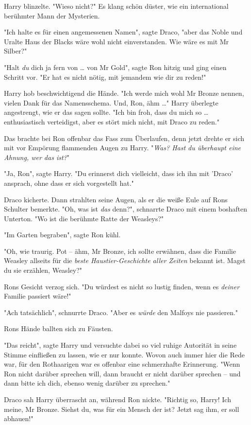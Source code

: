 {Harry blinzelte. "Wieso nicht?" Es klang schön düster, wie ein international berühmter Mann der Mysterien.

"Ich halte es für einen angemessenen Namen", sagte Draco, "aber das Noble und Uralte Haus der Blacks wäre wohl nicht einverstanden. Wie wäre es mit Mr Silber?"

"Halt \emph{du} dich ja fern von … von Mr Gold", sagte Ron hitzig und ging einen Schritt vor. "Er hat es nicht nötig, mit jemandem wie dir zu reden!"

Harry hob beschwichtigend die Hände. "Ich werde mich wohl Mr Bronze nennen, vielen Dank für das Namensschema. Und, Ron, ähm …" Harry überlegte angestrengt, wie er das sagen sollte. "Ich bin froh, dass du mich so … enthusiastisch verteidigst, aber es stört mich nicht, mit Draco zu reden."

Das brachte bei Ron offenbar das Fass zum Überlaufen, denn jetzt drehte er sich mit vor Empörung flammenden Augen zu Harry. "\emph{Was? Hast du überhaupt eine Ahnung, wer das ist?}"

"Ja, Ron", sagte Harry. "Du erinnerst dich vielleicht, dass ich ihn mit 'Draco' ansprach, ohne dass er sich vorgestellt hat."

Draco kicherte. Dann strahlten seine Augen, als er die weiße Eule auf Rons Schulter bemerkte. "Oh, was ist \emph{das} denn?", schnarrte Draco mit einem boshaften Unterton. "Wo ist die berühmte Ratte der Weasleys?"

"Im Garten begraben", sagte Ron kühl.

"Oh, wie traurig. Pot -- ähm, Mr Bronze, ich sollte erwähnen, dass die Familie Weasley allseits für die \emph{beste Haustier-Geschichte aller Zeiten} bekannt ist. Magst du sie erzählen, Weasley?"

Rons Gesicht verzog sich. "Du würdest es nicht so lustig finden, wenn es \emph{deiner} Familie passiert wäre!"

"Ach tatsächlich", schnurrte Draco. "Aber es \emph{würde} den Malfoys nie passieren."

Rons Hände ballten sich zu Fäusten.

"Das reicht", sagte Harry und versuchte dabei so viel ruhige Autorität in seine Stimme einfließen zu lassen, wie er nur konnte. Wovon auch immer hier die Rede war, für den Rothaarigen war es offenbar eine schmerzhafte Erinnerung. "Wenn Ron nicht darüber sprechen will, dann braucht er nicht darüber sprechen -- und dann bitte ich dich, ebenso wenig darüber zu sprechen."

Draco sah Harry überrascht an, während Ron nickte. "Richtig so, Harry! Ich meine, Mr Bronze. Siehst du, was für ein Mensch der ist? Jetzt sag ihm, er soll abhauen!"

}
